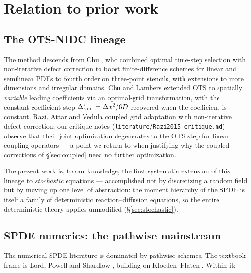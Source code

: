 \section{Relation to prior work}\label{sec:lit}

\subsection{The OTS-NIDC lineage}

The method descends from Chu \citep{chu2011}, who combined optimal time-step
selection with non-iterative defect correction to boost finite-difference
schemes for linear and semilinear PDEs to fourth order on three-point stencils,
with extensions to more dimensions and irregular domains. Chu and Lambers
\citep{chu2009} extended OTS to spatially \emph{variable} leading coefficients
via an optimal-grid transformation, with the constant-coefficient step
$\Delta t_{\mathrm{opt}} = \Delta x^2/6D$ recovered when the coefficient is constant. Razi, Attar and
Vedula \citep{razi2015} coupled grid adaptation with non-iterative defect
correction; our critique notes (\texttt{literature/Razi2015\_critique.md})
observe that their joint optimization degenerates to the OTS step for linear
coupling operators --- a point we return to when justifying why the coupled
corrections of \S\ref{sec:coupled} need no further optimization.

The present work is, to our knowledge, the first systematic extension of this
lineage to \emph{stochastic} equations --- accomplished not by discretizing a
random field but by moving up one level of abstraction: the moment hierarchy of
the SPDE is itself a family of deterministic reaction--diffusion equations, so
the entire deterministic theory applies unmodified (\S\ref{sec:stochastic}).

\subsection{SPDE numerics: the pathwise mainstream}

The numerical SPDE literature is dominated by pathwise schemes. The textbook
frame is Lord, Powell and Shardlow \citep{lord2014}, building on
Kloeden--Platen \citep{kloeden1992}. Within it:

